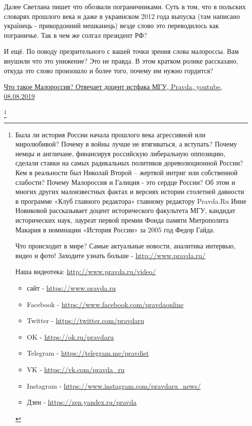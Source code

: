 \begin{itemize}
\begin{itemize}
 
Далее Светлана пишет что обозвали пограничниками. Суть в том, что в польских
словарях прошлого века и даже в украинском 2012 года выпуска (там написано
українець - прикордонний мешканець) везде слово это переводилось как
пограничье. Так в чем же солгал президент РФ?

 
И ещё. По поводу презрительного с вашей точки зрения слова малороссы. Вам
внушили что это унижение? Это не правда. В этом кратком ролике рассказано,
откуда это слово произошло и более того, почему им нужно гордится?

\href{https://youtu.be/OX1LN8p16lI}{%
Что такое Малороссия? Отвечает доцент истфака МГУ, Pravda, youtube, 08.08.2019%
}

\footnote{
Была ли история России начала прошлого века агрессивной или миролюбивой? Почему
в войны лучше не втягиваться, а вступать? Почему немцы и англичане, финансируя
российскую либеральную оппозицию, сделали ставки на самых радикальных политиков
дореволюционной России? Кем в реальности был Николай Второй – жертвой интриг
или собственной слабости? Почему Малороссия и Галиция - это сердце России? Об
этом и многих других малоизвестных фактах и версиях истории столетней давности
в программе «Клуб главного редактора» главному редактору  Pravda.Ru Инне
Новиковой рассказывает доцент исторического факультета МГУ, кандидат
исторических наук, лауреат первой премии Фонда памяти Митрополита Макария в
номинации «История России» за 2005 год Федор Гайда. 
 
Что происходит в мире? Самые актуальные новости, аналитика интервью, видео и
фото! Заходите узнать больше - \url{http://www.pravda.ru/}

Наша видеотека: \url{http://www.pravda.ru/video/}

\begin{itemize}
  \item сайт - \url{https://www.pravda.ru}
  \item Facebook - \url{https://www.facebook.com/pravdaonline}
  \item Twitter - \url{https://twitter.com/pravdaru}
  \item OK - \url{https://ok.ru/pravdaru}
  \item Telegram - \url{https://telegram.me/pravdist}
  \item VK - \url{https://vk.com/pravda_ru}
  \item Instagram - \url{https://www.instagram.com/pravdaru_news/}
  \item Дзен - \url{https://zen.yandex.ru/pravda}
\end{itemize}
}


\end{itemize}
\end{itemize}
